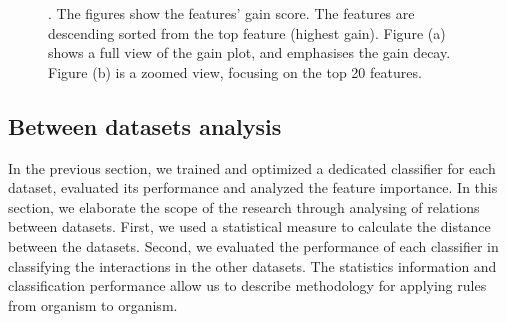 \documentclass{bmcart}
\begin{document}
\begin{figure}[h!]
    \centering
    \qquad
    \caption{. The figures show the features' gain score. The features are descending sorted from the top feature (highest gain). Figure (a) shows a full view of the gain plot, and emphasises the gain decay.  Figure (b) is a zoomed view, focusing on the top 20 features.}%
    \label{fig:feature_importance}%
\end{figure}




\subsection*{Between datasets analysis}
In the previous section, we trained and optimized a dedicated classifier for each dataset, evaluated its performance and analyzed the feature importance.
In this section, we elaborate the scope of the research through analysing of relations between datasets. 
First, we used a statistical measure to calculate the distance between the datasets. Second, we evaluated the performance of each classifier in classifying the interactions in the other datasets. 
The statistics information and classification performance allow us to describe methodology for applying rules from organism to organism.
\end{document}
